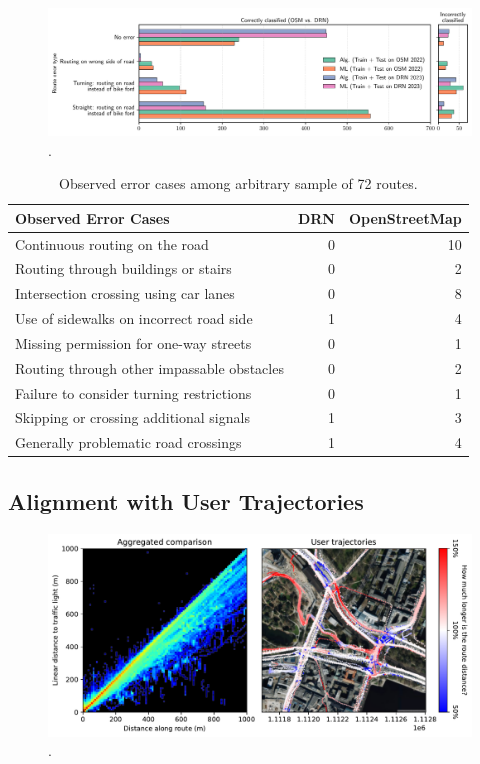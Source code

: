 \begin{figure}[htbp]
\centering 
\includegraphics[width=\linewidth]{images/matching-route-errors-osm-vs-drn.pdf}
\caption{.}
\label{fig:}
\end{figure}

\begin{table}[htbp]
\centering
\begin{tabular}{lrr}
\hline
\textbf{Observed Error Cases} & DRN & OpenStreetMap \\ \hline
Continuous routing on the road & 0 & 10 \\
Routing through buildings or stairs & 0 & 2 \\
Intersection crossing using car lanes & 0 & 8 \\
Use of sidewalks on incorrect road side & 1 & 4 \\
Missing permission for one-way streets & 0 & 1 \\
Routing through other impassable obstacles & 0 & 2 \\
Failure to consider turning restrictions & 0 & 1 \\
Skipping or crossing additional signals & 1 & 3 \\
Generally problematic road crossings & 1 & 4 \\
\hline
\end{tabular}
\caption{Observed error cases among arbitrary sample of 72 routes.}%
\label{tab:accuracy-comparison}%
\end{table}

\subsection{Alignment with User Trajectories}

\begin{figure}[htbp]
\centering 
\includegraphics[width=\linewidth]{images/routing-distance-analysis.pdf}
\caption{.}
\label{fig:}
\end{figure}



